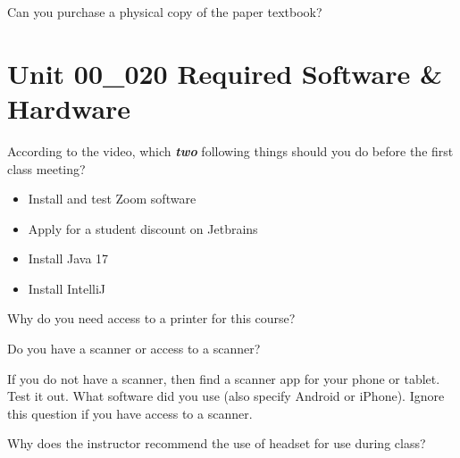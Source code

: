 \documentclass[letterpaper,12pt]{exam}
\newcommand{\unit}{Unit 00}
\begin{document}
\begin{questions}
\begin{samepage}
	\question Can you purchase a physical copy of the paper textbook?
	\vspace{5mm}
\end{samepage}

\section*{\unit\_020 Required Software \& Hardware} %

\begin{samepage}
	\question According to the video, which \textbf{\emph{two}} following things should you do before the first class meeting?
	  \begin{itemize}
		\item Install and test Zoom software
		
		\item Apply for a student discount on Jetbrains
		
		\item Install Java 17
		
		\item Install IntelliJ
		\vspace{5mm}
	   \end{itemize}
\end{samepage}

\begin{samepage}
	\question Why do you need access to a printer for this course?
	\vspace{5mm}
\end{samepage}

\begin{samepage}
	\question Do you have a scanner or access to a scanner?  
\end{samepage}

\begin{samepage}
	\question If you do not have a scanner, then find a scanner app for your phone or tablet.  Test it out.  What software did you use (also specify Android or iPhone).  Ignore this question if you have access to a scanner.
	\vspace{5mm}
\end{samepage}

\begin{samepage}
	\question Why does the instructor recommend the use of headset for use during class?
	\vspace{5mm}
\end{samepage}


\end{questions}
\end{document}
